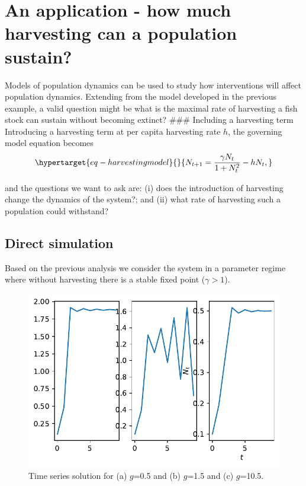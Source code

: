 \documentclass[
  letterpaper,
  DIV=11,
  numbers=noendperiod]{scrreprt}
\begin{document}
\hypertarget{an-application---how-much-harvesting-can-a-population-sustain}{%
\section{An application - how much harvesting can a population
sustain?}\label{an-application---how-much-harvesting-can-a-population-sustain}}

Models of population dynamics can be used to study how interventions
will affect population dynamics. Extending from the model developed in
the previous example, a valid question might be what is the maximal rate
of harvesting a fish stock can sustain without becoming extinct? \#\#\#
Including a harvesting term Introducing a harvesting term at per capita
harvesting rate \(h\), the governing model equation becomes
\begin{equation}\protect\hypertarget{eq-harvestingmodel}{}{
N_{t+1}=\frac{\gamma N_t}{1+N_t^2} - h N_t,
}\label{eq-harvestingmodel}\end{equation}

and the questions we want to ask are: (i) does the introduction of
harvesting change the dynamics of the system?; and (ii) what rate of
harvesting such a population could withstand?

\hypertarget{direct-simulation}{%
\subsection{Direct simulation}\label{direct-simulation}}

Based on the previous analysis we consider the system in a parameter
regime where without harvesting there is a stable fixed point
(\(\gamma>1\)).

\begin{figure}

{\centering \includegraphics{MA32009-SinglePopDiscreteTimea_files/figure-pdf/fig-plotdensmodelharvest-output-1.pdf}

}

\caption{\label{fig-plotdensmodelharvest}Time series solution for (a)
\(g\)=0.5 and (b) \(g\)=1.5 and (c) \(g\)=10.5.}

\end{figure}
\end{document}

